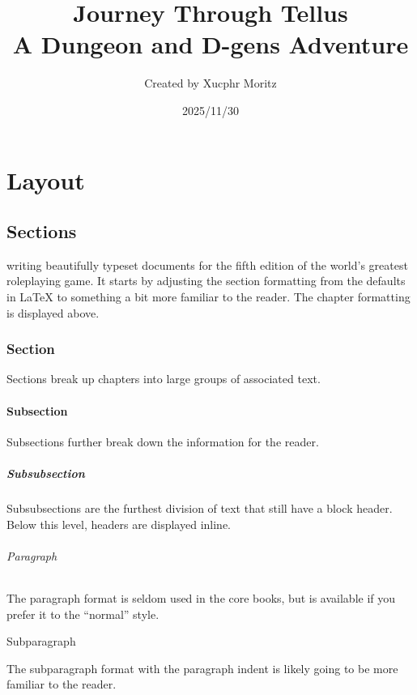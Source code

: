 \documentclass[letterpaper,twocolumn,openany,nodeprecatedcode]{dndbook}
\title{Journey Through Tellus \\
\large A Dungeon and D-gens Adventure}
\author{Created by Xucphr Moritz}
\date{2025/11/30}
\begin{document}
\frontmatter

\maketitle

\tableofcontents

\mainmatter%

\part{Layout}

\chapter{Sections}

 writing beautifully typeset documents for the fifth edition of the world's greatest roleplaying game. It starts by adjusting the section formatting from the defaults in \LaTeX{} to something a bit more familiar to the reader. The chapter formatting is displayed above.

\section{Section}
Sections break up chapters into large groups of associated text.

\subsection{Subsection}
Subsections further break down the information for the reader.

\subsubsection{Subsubsection}
Subsubsections are the furthest division of text that still have a block header. Below this level, headers are displayed inline.

\paragraph{Paragraph}
The paragraph format is seldom used in the core books, but is available if you prefer it to the ``normal'' style.

\subparagraph{Subparagraph}
The subparagraph format with the paragraph indent is likely going to be more familiar to the reader.
\end{document}
